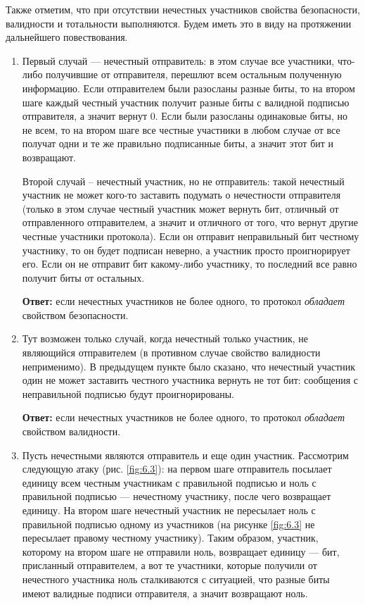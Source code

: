 \documentclass[12pt, a4paper]{extarticle}
\newcommand{\Answer}[1]{\textbf{Ответ:} #1}
\begin{document}
Также отметим, что при отсутствии нечестных участников свойства безопасности, валидности и тотальности
выполняются. Будем иметь это в виду на протяжении дальнейшего повествования.

\begin{enumerate}
    \item Первый случай --- нечестный отправитель: в этом случае все участники, что-либо получившие от 
        отправителя, перешлют всем остальным полученную информацию. Если отправителем были разосланы 
        разные биты, то на втором шаге каждый честный участник получит разные биты с валидной подписью 
        отправителя, а значит вернут 0. Если были разосланы одинаковые биты, но не всем, то на втором 
        шаге все честные участники в любом случае от все получат одни и те же правильно подписанные биты,
        а значит этот бит и возвращают.
        
        Второй случай -- нечестный участник, но не отправитель: такой нечестный участник не может кого-то
        заставить подумать о нечестности отправителя (только в этом случае честный участник может вернуть
        бит, отличный от отправленного отправителем, а значит и отличного от того, что вернут другие честные
        участники протокола). Если он отправит неправильный бит честному участнику, то он будет подписан 
        неверно, а участник просто проигнорирует его. Если он не отправит бит какому-либо участнику, то 
        последний все равно получит биты от остальных.
        
        \Answer{если нечестных участников не более одного, то протокол \textit{обладает} свойством 
            безопасности.}
        
    \item Тут возможен только случай, когда нечестный только участник, не являющийся отправителем (в противном
        случае свойство валидности неприменимо). В предыдущем пункте было сказано, что нечестный участник
        один не может заставить честного участника вернуть не тот бит: сообщения с неправильной подписью
        будут проигнорированы.
        
        \Answer{если нечестных участников не более одного, то протокол \textit{обладает} свойством 
            валидности.}
        
    \item Пусть нечестными являются отправитель и еще один участник. Рассмотрим следующую атаку (рис. 
        \ref{fig:6.3}): на первом шаге отправитель посылает единицу всем честным участникам с правильной
        подписью и ноль с правильной подписью --- нечестному участнику, после чего возвращает единицу. На
        втором шаге нечестный участник не пересылает ноль с правильной подписью одному из участников (на
        рисунке \ref{fig:6.3} не пересылает правому честному участнику). Таким образом, участник, которому
        на втором шаге не отправили ноль, возвращает единицу --- бит, присланный отправителем, а вот те
        участники, которые получили от нечестного участника ноль сталкиваются с ситуацией, что разные биты
        имеют валидные подписи отправителя, а значит возвращают ноль.
        

\end{enumerate}
\end{document}
